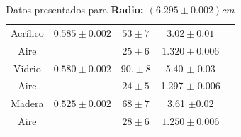\documentclass[letterpaper, 11 pt]{article}
\begin{document}
\begin{multicols}{2}
\begin{table}[H]
\begin{center}
\begin{tabular}{ |c|c|c|c|c| }
Acrílico  & $0.585 \pm 0.002$  & $53\pm7$  &$3.02 \pm 0.01 $ \\
Aire      &                   & $25 \pm 6$ & $ 1.320 \pm 0.006$\\
\hline

Vidrio  &  $0.580 \pm 0.002$   & $90.\pm8$ & 5.40 $\pm$ 0.03\\
Aire   &                       & $24 \pm 5$ &1.297 $\pm$ 0.006 \\
\hline

Madera & $0.525 \pm 0.002$ & $68\pm7$  & 3.61 $\pm 0.02$\\
Aire &                      &$28 \pm 6$ &$1.250\pm 0.006$ \\

\hline

\end{tabular}
\end{center}

\caption{Datos presentados para 
\textbf{Radio: $(6.295 \pm 0.002) cm$}}
\label{Tabla 1}
\end{table}




\begin{table}[H]
\begin{center}
\end{center}
\caption{Datos presentados para \textbf{Radio: $(8.300 \pm 0.002) cm$}}
\label{Tabla 1}
\end{table}



\end{multicols}
\end{document}
